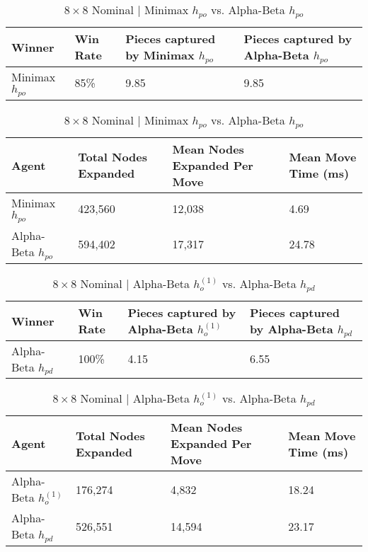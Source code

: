 \documentclass{article}[12pt]
\begin{document}
	   \begin{table}[ht]
	   	\centering
	   	\begin{tabular}{l | l | l | l}
	   		\hline
	   		Winner & Win Rate & Pieces captured by Minimax $h_{po}$ & Pieces captured by Alpha-Beta $h_{po}$ \\
	   		\hline \hline 
	   		Minimax $h_{po}$ & 85\% & 9.85 & 9.85 \\
	   		\hline
	   	\end{tabular}
   	
   	\vspace{10px}
   	
   		\begin{tabular}{l | l | l | l}
   			\hline
   			Agent & Total Nodes Expanded & Mean Nodes Expanded Per Move & Mean Move Time (ms) \\
   			\hline \hline 
   			Minimax $h_{po}$ & 423,560& 12,038& 4.69 \\
   			Alpha-Beta $h_{po}$ & 594,402 & 17,317 & 24.78\\
   			\hline
   		\end{tabular}
	   	\caption{$8 \times 8$ Nominal | Minimax $h_{po}$ vs. Alpha-Beta $h_{po}$} \label{tab:t11}
	   \end{table}
   
   
   \begin{table}[ht]
   	\centering
   	\begin{tabular}{l | l | l | l}
   		\hline
   		Winner & Win Rate & Pieces captured by Alpha-Beta $h_{o}^{(1)}$ & Pieces captured by Alpha-Beta $h_{pd}$ \\
   		\hline \hline 
   		Alpha-Beta $h_{pd}$ & 100\% & 4.15 & 6.55 \\
   		\hline
   	\end{tabular}
   	
   	\vspace{10px}
   	
   	\begin{tabular}{l | l | l | l}
   		\hline
   		Agent & Total Nodes Expanded & Mean Nodes Expanded Per Move & Mean Move Time (ms) \\
   		\hline \hline 
   		Alpha-Beta $h_{o}^{(1)}$ & 176,274& 4,832& 18.24 \\
   		Alpha-Beta $h_{pd}$ & 526,551 & 14,594 & 23.17\\
   		\hline
   	\end{tabular}
   	\caption{$8 \times 8$ Nominal | Alpha-Beta $h_{o}^{(1)}$ vs. Alpha-Beta $h_{pd}$} \label{tab:t12}
   \end{table}
\end{document}
